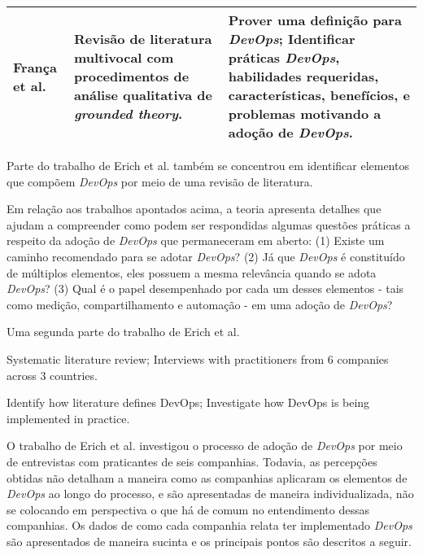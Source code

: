 \begin{table}[hb!]
\begin{tabular}{|p{3cm}|p{6cm}|p{6cm}|}
\hline

\textbf{Fran\c{c}a et al.~\cite{characterizing_devops}}

& Revisão de literatura multivocal com procedimentos de análise qualitativa de
{\it grounded theory}.

& Prover uma definição para {\it DevOps}; \newline \newline
Identificar práticas {\it DevOps}, habilidades requeridas, características,
benefícios, e problemas motivando a adoção de {\it DevOps}. \\

\hline

\end{tabular}
\end{table}

Parte do trabalho de Erich et al. \cite{qualitative_devops_journalsw_17} também
se concentrou em identificar elementos que compõem {\it DevOps} por meio de uma
revisão de literatura.

Em relação aos trabalhos apontados acima, a teoria apresenta detalhes que ajudam a
compreender como podem ser respondidas algumas questões práticas a
respeito da adoção de {\it DevOps} que permaneceram em aberto: (1) Existe um caminho
recomendado para se adotar \textit{DevOps}? (2) Já que \textit{DevOps} é
constituído de múltiplos elementos, eles possuem a mesma relevância quando se
adota \textit{DevOps}? (3) Qual é o papel desempenhado por cada um desses
elementos - tais como medição, compartilhamento e automação - em uma adoção de
\textit{DevOps}?



Uma segunda parte do trabalho de Erich et al. \cite{qualitative_devops_journalsw_17}

Systematic literature review;
Interviews with practitioners from 6 companies across 3 countries.

Identify how literature defines DevOps;
Investigate how DevOps is being implemented in practice.

O trabalho de Erich et al. \cite{qualitative_devops_journalsw_17} investigou
o processo de adoção de \textit{DevOps} por meio de entrevistas com praticantes
de seis companhias. Todavia, as percepções obtidas não detalham a maneira como
as companhias aplicaram os elementos de \textit{DevOps} ao longo do processo,
e são apresentadas de maneira individualizada, não se colocando em perspectiva
o que há de comum no entendimento dessas companhias. Os dados de como cada
companhia relata ter implementado \textit{DevOps} são apresentados de maneira
sucinta e os principais pontos são descritos a seguir.

